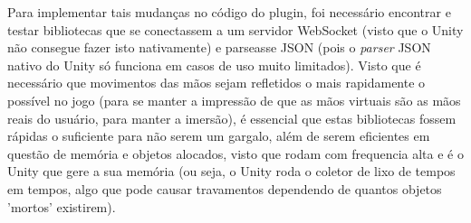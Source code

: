 Para implementar tais mudanças no código do plugin, foi necessário encontrar e testar bibliotecas que se conectassem a um servidor WebSocket (visto que o Unity não consegue fazer isto nativamente) e parseasse JSON (pois o \textit{parser} JSON nativo do Unity só funciona em casos de uso muito limitados). Visto que é necessário que movimentos das mãos sejam refletidos o mais rapidamente o possível no jogo (para se manter a impressão de que as mãos virtuais são as mãos reais do usuário, para manter a imersão), é essencial que estas bibliotecas fossem rápidas o suficiente para não serem um gargalo, além de serem eficientes em questão de memória e objetos alocados, visto que rodam com frequencia alta e é o Unity que gere a sua memória (ou seja, o Unity roda o coletor de lixo de tempos em tempos, algo que pode causar travamentos dependendo de quantos objetos 'mortos' existirem).

